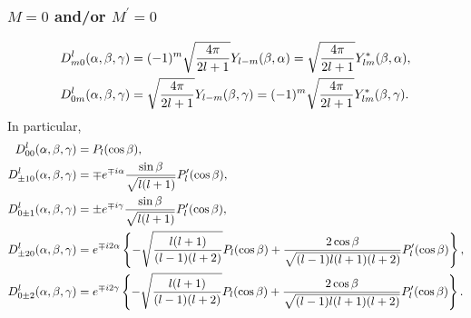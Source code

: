 \subsubsection{ $M=0$ and/or $M^{\prime}=0$}
\begin{align}
& D_{m 0}^{l}(\alpha, \beta, \gamma)=(-1)^{m} \sqrt{\frac{4 \pi}{2 l+1}} Y_{l-m}(\beta, \alpha)=\sqrt{\frac{4 \pi}{2 l+1}} Y_{l m}^{*}(\beta, \alpha),  \notag\\
& D_{0 m}^{l}(\alpha, \beta, \gamma)=\sqrt{\frac{4 \pi}{2 l+1}} Y_{l-m}(\beta, \gamma)=(-1)^{m} \sqrt{\frac{4 \pi}{2 l+1}} Y_{l m}^{*}(\beta, \gamma). \label{eq:4:17:1}
\end{align}
In particular,
\begin{align}
D_{00}^{l}(\alpha, \beta, \gamma) & =P_{l}(\cos \beta) , \notag\\
D_{ \pm 10}^{l}(\alpha, \beta, \gamma) & =\mp e^{\mp i \alpha} \frac{\sin \beta}{\sqrt{l(l+1)}} P_{l}^{\prime}(\cos \beta) , \notag\\
D_{0 \pm 1}^{l}(\alpha, \beta, \gamma) & = \pm e^{\mp i \gamma} \frac{\sin \beta}{\sqrt{l(l+1)}} P_{l}^{\prime}(\cos \beta) , \label{eq:4:17:2}\\
D_{ \pm 20}^{l}(\alpha, \beta, \gamma) & =e^{\mp i 2 \alpha}\left\{-\sqrt{\frac{l(l+1)}{(l-1)(l+2)}} P_{l}(\cos \beta)+\frac{2 \cos \beta}{\sqrt{(l-1) l(l+1)(l+2)}} P_{l}^{\prime}(\cos \beta)\right\} , \notag\\
D_{0 \pm 2}^{l}(\alpha, \beta, \gamma) & =e^{\mp i 2 \gamma}\left\{-\sqrt{\frac{l(l+1)}{(l-1)(l+2)}} P_{l}(\cos \beta)+\frac{2 \cos \beta}{\sqrt{(l-1) l(l+1)(l+2)}} P_{l}^{\prime}(\cos \beta)\right\} . \notag
\end{align}
